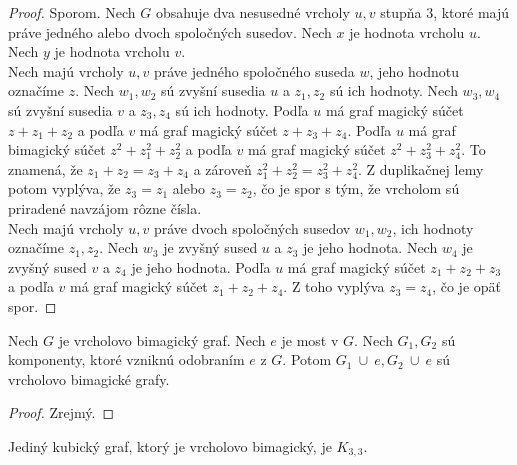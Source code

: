\begin{proof} Sporom. Nech $G$ obsahuje dva nesusedné vrcholy $u,v$ stupňa 3, ktoré majú práve jedného alebo dvoch spoločných susedov. Nech $x$ je hodnota vrcholu $u$. Nech $y$ je hodnota vrcholu $v$. \\

Nech majú vrcholy $u,v$ práve jedného spoločného suseda $w$, jeho hodnotu označíme $z$. Nech $w_1, w_2$ sú zvyšní susedia $u$ a $z_1, z_2$ sú ich hodnoty. Nech $w_3, w_4$ sú zvyšní susedia $v$ a $z_3, z_4$ sú ich hodnoty. Podľa $u$ má graf magický súčet $z + z_1 + z_2$ a podľa $v$ má graf magický súčet $z + z_3 + z_4$. Podľa $u$ má graf bimagický súčet $z^2 + z^2_1 + z^2_2$ a podľa $v$ má graf magický súčet $z^2 + z^2_3 + z^2_4$. To znamená, že $z_1 + z_2 = z_3 + z_4$ a zároveň $z^2_1 + z^2_2 = z^2_3 + z^2_4$. Z duplikačnej lemy potom vyplýva, že $z_3 = z_1$ alebo $z_3 = z_2$, čo je spor s tým, že vrcholom sú priradené navzájom rôzne čísla. \\

Nech majú vrcholy $u,v$ práve dvoch spoločných susedov $w_1, w_2$, ich hodnoty označíme $z_1, z_2$. Nech $w_3$ je zvyšný sused $u$ a $z_3$ je jeho hodnota. Nech $w_4$ je zvyšný sused $v$ a $z_4$ je jeho hodnota. Podľa $u$ má graf magický súčet $z_1 + z_2 + z_3$ a podľa $v$ má graf magický súčet $z_1 + z_2 + z_4$. Z toho vyplýva $z_3 = z_4$, čo je opäť spor.
\end{proof}

\begin{theorem} Nech $G$ je vrcholovo bimagický graf. Nech $e$ je most v $G$. Nech $G_1, G_2$ sú komponenty, ktoré vzniknú odobraním $e$ z $G$. Potom $G_1 ~\cup~ e, G_2 ~\cup~ e$ sú vrcholovo bimagické grafy. 
\end{theorem}

\begin{proof}
Zrejmý.
\end{proof}

\begin{theorem} Jediný kubický graf, ktorý je vrcholovo bimagický, je $K_{3,3}$.
\end{theorem}

